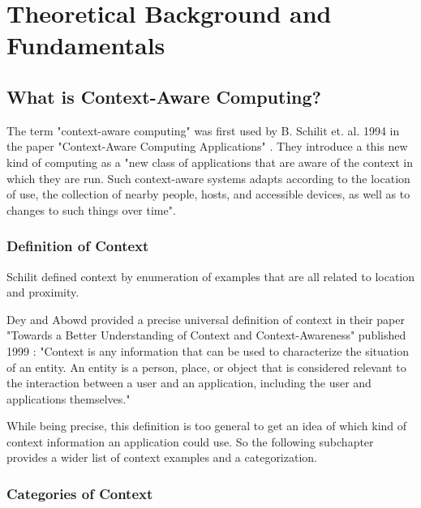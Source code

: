 \chapter{Theoretical Background and Fundamentals}


\section{What is Context-Aware Computing?}

The term "context-aware computing" was first used by B. Schilit et. al. 1994 in the paper "Context-Aware Computing Applications" \cite{Schilit94context-awarecomputing}. They introduce a this new kind of computing as a "new class of applications that are aware of the context in which they are run. Such context-aware systems adapts according to the location of use, the collection of nearby people, hosts, and accessible devices, as well as to changes to such things over time".

\subsection{Definition of Context}

Schilit defined context by enumeration of examples that are all related to location and proximity.

Dey and Abowd provided a precise universal definition of context in their paper "Towards a Better Understanding of Context and Context-Awareness" published 1999 \cite{Abowd99}: "Context is any information that can be used to characterize the situation of an entity. An entity is a person, place, or object that is considered relevant to the interaction between a user and an application, including the user and applications themselves."

While being precise, this definition is too general to get an idea of which kind of context information an application could use. So the following subchapter provides a wider list of context examples and a categorization.


\subsection{Categories of Context}

